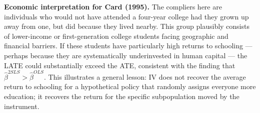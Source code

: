 \documentclass[letterpaper,12pt]{article}
\begin{document}
\begin{enumerate}[label=(\alph*)]
\medskip
\textbf{Economic interpretation for Card (1995).} The compliers here are individuals who would not have attended a four-year college had they grown up away from one, but did because they lived nearby. This group plausibly consists of lower-income or first-generation college students facing geographic and financial barriers. If these students have particularly high returns to schooling --- perhaps because they are systematically underinvested in human capital --- the LATE could substantially exceed the ATE, consistent with the finding that $\hat{\beta}^{2SLS} > \hat{\beta}^{OLS}$. This illustrates a general lesson: IV does not recover the average return to schooling for a hypothetical policy that randomly assigns everyone more education; it recovers the return for the specific subpopulation moved by the instrument.

\end{enumerate}
\end{document}
